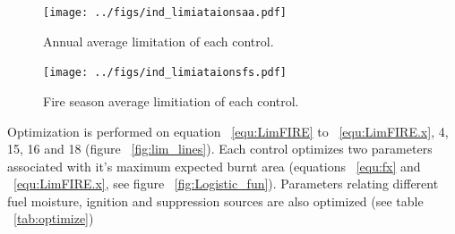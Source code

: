 \begin{figure}[!ht]
  \centering
    \texttt{[image: ../figs/ind\_limiataionsaa.pdf]}
  \caption{Annual average limitation of each control.}
  \label{fig:Annual_average_con}
\end{figure}

\begin{figure}[!ht]
  \centering
    \texttt{[image: ../figs/ind\_limiataionsfs.pdf]}
  \caption{Fire season average limitiation of each control.}
  \label{fig:Season_con}
\end{figure}

Optimization is performed on equation ~\ref{equ:LimFIRE} to ~\ref{equ:LimFIRE.x}, 4, 15, 16 and 18 %
(figure ~\ref{fig:lim_lines}). Each control optimizes two parameters associated with it's maximum expected burnt area (equations ~\ref{equ:fx} and ~\ref{equ:LimFIRE.x}, see figure ~\ref{fig:Logistic_fun}).
Parameters relating different fuel moisture, ignition and suppression sources are also optimized (see table ~\ref{tab:optimize})

